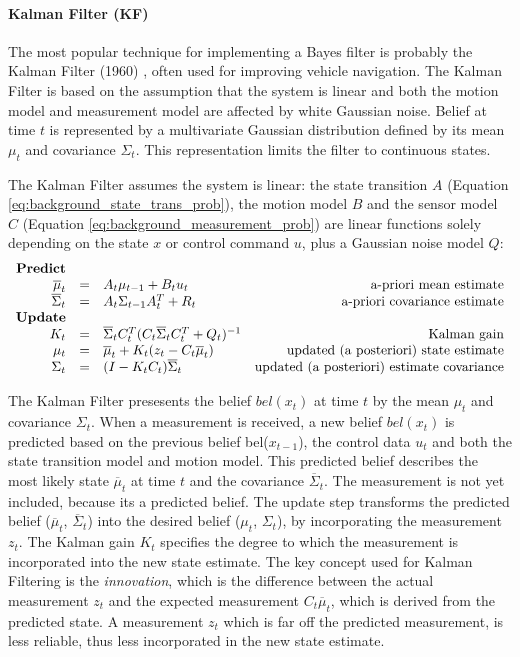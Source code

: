 {\paragraph{Kalman Filter (KF)}
The most popular technique for implementing a Bayes filter is probably the Kalman Filter (1960) \cite{kalman1960new}, often used for improving vehicle navigation.
The Kalman Filter is based on the assumption that the system is linear and both the motion model and measurement model are affected by white Gaussian noise.
Belief at time $t$ is represented by a multivariate Gaussian distribution defined by its mean $\mu_t$ and covariance $\Sigma_t$.
This representation limits the filter to continuous states.

The Kalman Filter assumes the system is linear: the state transition $A$ (Equation \ref{eq:background_state_trans_prob}), the motion model $B$ and the sensor model $C$ (Equation \ref{eq:background_measurement_prob}) are linear functions solely depending on the state $x$ or control command $u$, plus a Gaussian noise model $Q$:
\begin{equation}
\label{eq:KF}
\begin{array}{rclr}
\text{\textbf{Predict}} \\
\overline{\mu}_t & = & A_t \mu_{t-1} + B_t u_t  & \text{a-priori mean estimate} \\
\overline{\Sigma}_t & = & A_t \Sigma_{t-1} A_t^T + R_t  & \text{a-priori covariance estimate} \\
\text{\textbf{Update}} \\
K_t & = & \overline{\Sigma}_t C_t^T (C_t \overline{\Sigma}_t C_t^T + Q_t)^{-1} & \text{Kalman gain} \\
\mu_t & = & \overline{\mu}_t + K_t(z_t - C_t \overline{\mu}_t) & \text{updated (a posteriori) state estimate} \\
\Sigma_t & = & (I - K_t C_t) \overline{\Sigma}_t & \text{updated (a posteriori) estimate covariance}
\end{array}
\end{equation}

The Kalman Filter presesents the belief $bel(x_t)$ at time $t$ by the mean $\mu_t$ and covariance $\Sigma_t$.
When a measurement is received, a new belief $bel(x_t)$ is predicted based on the previous belief bel($x_{t-1}$), the control data $u_t$ and both the state transition model and motion model.
This predicted belief describes the most likely state $\overline{\mu}_t$ at time $t$ and the covariance $\overline{\Sigma}_t$.
The measurement is not yet included, because its a predicted belief.
The update step transforms the predicted belief ($\overline{\mu}_t$, $\overline{\Sigma}_t$) into the desired belief ($\mu_t$, $\Sigma_t$), by incorporating the measurement $z_t$.
The Kalman gain $K_t$ specifies the degree to which the measurement is incorporated into the new state estimate.
The key concept used for Kalman Filtering is the \textit{innovation}, which is the difference between the actual measurement $z_t$ and the expected measurement $C_t \overline{\mu}_t$, which is derived from the predicted state.
A measurement $z_t$ which is far off the predicted measurement, is less reliable, thus less incorporated in the new state estimate.

}
